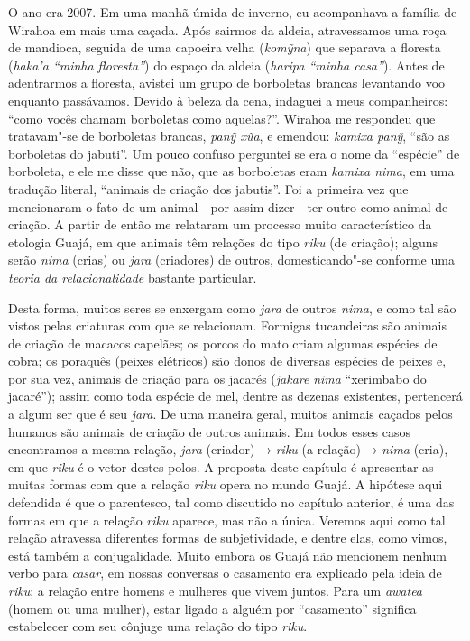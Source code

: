 \noindent O ano era 2007. Em uma manhã úmida de inverno, eu acompanhava a família
de Wirahoa em mais uma caçada. Após sairmos da aldeia, atravessamos uma
roça de mandioca, seguida de uma capoeira velha (\emph{komỹna}) que
separava a floresta (\emph{haka'a ``minha floresta''}) do espaço da
aldeia (\emph{haripa ``minha casa''}). Antes de adentrarmos a floresta,
avistei um grupo de borboletas brancas levantando voo enquanto
passávamos. Devido à beleza da cena, indaguei a meus companheiros: ``como
vocês chamam borboletas como aquelas?''. Wirahoa me respondeu que
tratavam"-se de borboletas brancas, \emph{panỹ xũa}, e emendou:
\emph{kamixa panỹ}, ``são as borboletas do jabuti''. Um pouco confuso
perguntei se era o nome da ``espécie'' de borboleta, e ele me disse que
não, que as borboletas eram \emph{kamixa nima}, em uma tradução literal,
``animais de criação dos jabutis''. Foi a primeira vez que mencionaram o
fato de um animal - por assim dizer - ter outro como animal de criação.
A partir de então me relataram um processo muito característico da
etologia Guajá, em que animais têm relações do tipo \emph{riku} (de
criação); alguns serão \emph{nima} (crias) ou \emph{jara} (criadores) de
outros, domesticando"-se conforme uma \emph{teoria da relacionalidade}
bastante particular.

Desta forma, muitos seres se enxergam como \emph{jara} de outros
\emph{nima}, e como tal são vistos pelas criaturas com que se
relacionam. Formigas tucandeiras são animais de criação de macacos
capelães; os porcos do mato criam algumas espécies de cobra; os poraquês
(peixes elétricos) são donos de diversas espécies de peixes e, por sua
vez, animais de criação para os jacarés (\emph{jakare} \emph{nima}
``xerimbabo do jacaré''); assim como toda espécie de mel, dentre as
dezenas existentes, pertencerá a algum ser que é seu \emph{jara}. De uma
maneira geral, muitos animais caçados pelos humanos são animais de
criação de outros animais. Em todos esses casos encontramos a mesma
relação, \emph{jara} (criador) → \emph{riku} (a relação) → \emph{nima}
(cria), em que \emph{riku} é o vetor destes polos. A proposta deste
capítulo é apresentar as muitas formas com que a relação \emph{riku}
opera no mundo Guajá. A hipótese aqui defendida é que o parentesco, tal
como discutido no capítulo anterior, é uma das formas em que a relação
\emph{riku} aparece, mas não a única. Veremos aqui como tal relação
atravessa diferentes formas de subjetividade, e dentre elas, como vimos,
está também a conjugalidade. Muito embora os Guajá não mencionem nenhum
verbo para \emph{casar}, em nossas conversas o casamento era explicado
pela ideia de \emph{riku}; a relação entre homens e mulheres que vivem
juntos. Para um \emph{awatea} (homem ou uma mulher), estar ligado a
alguém por ``casamento'' significa estabelecer com seu cônjuge uma relação
do tipo \emph{riku}.

